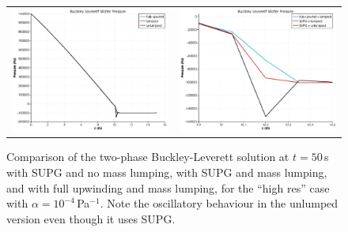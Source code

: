 \documentclass[]{scrreprt}
\begin{document}
\begin{figure}[htb]
\centering
\begin{tabular}{cc}
\includegraphics[width=7cm]{bl_lumped_unlumped.eps} &
\includegraphics[width=7cm]{bl_lumped_unlumped_zoom.eps}
\end{tabular}
\caption{Comparison of the two-phase Buckley-Leverett solution at
  $t=50$\,s with SUPG and no mass lumping, with SUPG and mass lumping,
  and with full upwinding and mass lumping, for
  the ``high res'' case 
  with $\alpha = 10^{-4}$\,Pa$^{-1}$.  Note the oscillatory
  behaviour in the unlumped version even though it uses SUPG.}
\label{bl_lump.fig}
\end{figure}
\end{document}

